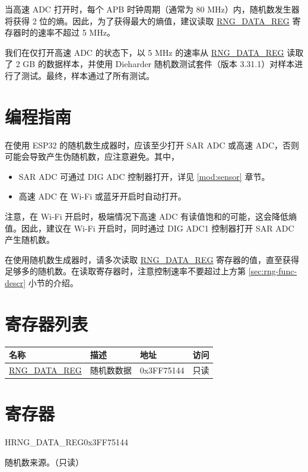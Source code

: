 \documentclass[main\_\_CN.tex]{subfiles}
\begin{document}
当高速 ADC 打开时，每个 APB 时钟周期（通常为 80 MHz）内，随机数发生器将获得 2 位的熵。因此，为了获得最大的熵值，建议读取 \hyperref[regdesc:RNGDATAREG]{RNG\_DATA\_REG} 寄存器时的速率不超过 5 MHz。

我们在仅打开高速 ADC 的状态下，以 5 MHz 的速率从 \hyperref[regdesc:RNGDATAREG]{RNG\_DATA\_REG} 读取了 2 GB 的数据样本，并使用 Dieharder 随机数测试套件（版本 3.31.1）对样本进行了测试。最终，样本通过了所有测试。


\section{编程指南}\label{sec:rng-programming}

在使用 ESP32 的随机数生成器时，应该至少打开 SAR ADC 或高速 ADC，否则可能会导致产生伪随机数，应注意避免。其中，
\begin{itemize}
    \item SAR ADC 可通过 DIG ADC 控制器打开，详见 \ref{mod:sensor} \textit{} 章节。
    \item 高速 ADC 在 Wi-Fi 或蓝牙开启时自动打开。
\end{itemize}

\begin{tiplisting}
注意，在 Wi-Fi 开启时，极端情况下高速 ADC 有读值饱和的可能，这会降低熵值。因此，建议在 Wi-Fi 开启时，同时通过 DIG ADC1 控制器打开 SAR ADC 产生随机数。
\end{tiplisting}

在使用随机数生成器时，请多次读取 \hyperref[regdesc:RNGDATAREG]{RNG\_DATA\_REG} 寄存器的值，直至获得足够多的随机数。在读取寄存器时，注意控制速率不要超过上方第 \ref{sec:rng-func-descr} 小节的介绍。

\hypertarget{rng-reg-summ}{}
\section{寄存器列表}
\label{sec:rng-reg-summ}
\begin{longtable}{ | p{5cm} | p{6cm} | p{3cm} | p{1cm} | }
\hline\rowcolor{lightgray}
名称 & 描述 & 地址 & 访问 \\ \hline
\hyperref[regdesc:RNGDATAREG]{RNG\_DATA\_REG} & 随机数数据 & 0x3FF75144 & 只读 \\ \hline
\end{longtable}

\section{寄存器}

\begin{register}{H}{RNG\_DATA\_REG}{0x3FF75144}\label{regdesc:RNGDATAREG}
%
\regnewline%
\begin{regdesc}\begin{reglist}
\item [RNG\_DATA\_REG]随机数来源。（只读）
\end{reglist}\end{regdesc}
\end{register}
\end{document}
